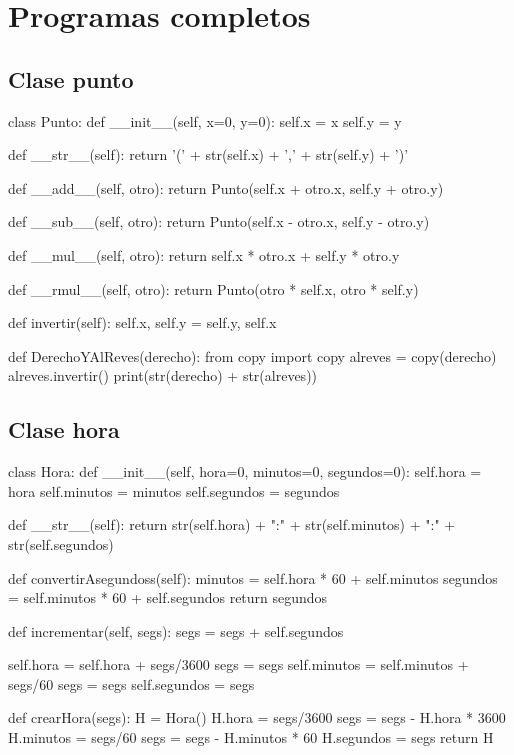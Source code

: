 
\chapter{Programas completos}

\section{Clase punto}

\begin{pythoncode}
class Punto:
  def __init__(self, x=0, y=0):
    self.x = x
    self.y = y

  def __str__(self):
    return '(' + str(self.x) + ',' + str(self.y) + ')'

  def __add__(self, otro):
    return Punto(self.x + otro.x, self.y + otro.y)

  def __sub__(self, otro):
    return Punto(self.x - otro.x, self.y - otro.y)

  def __mul__(self, otro):
    return self.x * otro.x + self.y * otro.y

  def __rmul__(self, otro):
    return Punto(otro * self.x, otro * self.y)

  def invertir(self):
    self.x, self.y = self.y, self.x

  def DerechoYAlReves(derecho):
    from copy import copy
    alreves = copy(derecho)
    alreves.invertir()
    print(str(derecho) + str(alreves))
\end{pythoncode}

\section{Clase hora}

\begin{pythoncode}
class Hora:
  def __init__(self, hora=0, minutos=0, segundos=0):
    self.hora = hora
    self.minutos = minutos
    self.segundos = segundos

  def __str__(self):
    return str(self.hora) + ":" + str(self.minutos) + 
           ":" + str(self.segundos)

  def convertirAsegundoss(self):
    minutos = self.hora * 60 + self.minutos
    segundos = self.minutos * 60 + self.segundos
    return segundos

  def incrementar(self, segs):
    segs = segs + self.segundos

    self.hora = self.hora + segs/3600
    segs = segs %
    self.minutos = self.minutos + segs/60
    segs = segs %
    self.segundos = segs

def crearHora(segs):
  H = Hora()
  H.hora = segs/3600
  segs = segs - H.hora * 3600
  H.minutos = segs/60
  segs = segs - H.minutos * 60
  H.segundos = segs
  return H
\end{pythoncode}

